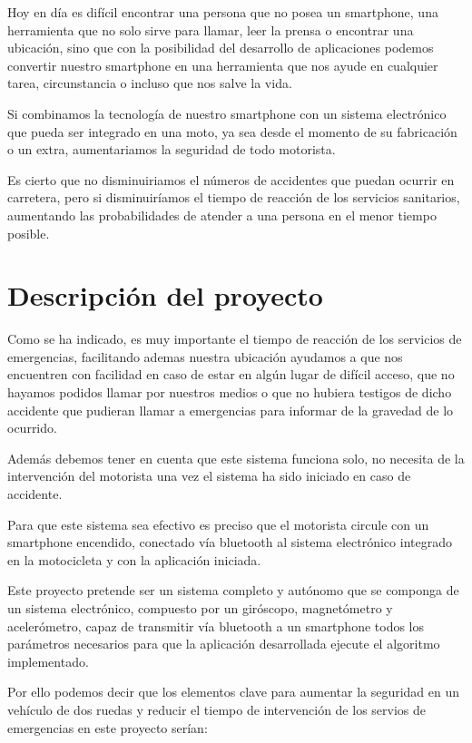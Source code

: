 		Hoy en d\'ia es dif\'icil encontrar una persona que no posea un smartphone, una herramienta que no solo sirve para llamar, leer la prensa o encontrar una ubicaci\'on, sino que con la posibilidad del desarrollo de aplicaciones podemos convertir nuestro smartphone en una herramienta que nos ayude en cualquier tarea, circunstancia o incluso que nos salve la vida.
		
		Si combinamos la tecnolog\'ia de nuestro smartphone con un sistema electr\'onico que pueda ser integrado en una moto, ya sea desde el momento de su fabricaci\'on o un extra, aumentariamos la seguridad de todo motorista.
		
		Es cierto que no disminuiriamos el números de accidentes que puedan ocurrir en carretera, pero si disminuir\'iamos el tiempo de reacci\'on de los servicios sanitarios, aumentando las probabilidades de atender a una persona en el menor tiempo posible.
		
	\section{Descripci\'on del proyecto}
	
		Como se ha indicado, es muy importante el tiempo de reacci\'on de los servicios de emergencias, facilitando ademas nuestra ubicaci\'on ayudamos a que nos encuentren con facilidad en caso de estar en alg\'un lugar de dif\'icil acceso, que no hayamos podidos llamar por nuestros medios o que no hubiera testigos de dicho accidente que pudieran llamar a emergencias para informar de la gravedad de lo ocurrido.
		
		Adem\'as debemos tener en cuenta que este sistema funciona solo, no necesita de la intervenci\'on del motorista una vez el sistema ha sido iniciado en caso de accidente.
		
		Para que este sistema sea efectivo es preciso que el motorista circule con un smartphone encendido, conectado v\'ia bluetooth al sistema electr\'onico integrado en la motocicleta y con la aplicaci\'on iniciada.
		
		Este proyecto pretende ser un sistema completo y aut\'onomo que se componga de un sistema electr\'onico, compuesto por un gir\'oscopo, magnet\'ometro y aceler\'ometro, capaz de transmitir v\'ia bluetooth a un smartphone todos los par\'ametros necesarios para que la aplicaci\'on desarrollada ejecute el algoritmo implementado.
				
		Por ello podemos decir que los elementos clave para aumentar la seguridad en un veh\'iculo de dos ruedas y reducir el tiempo de intervenci\'on de los servios de emergencias en este proyecto ser\'ian:

